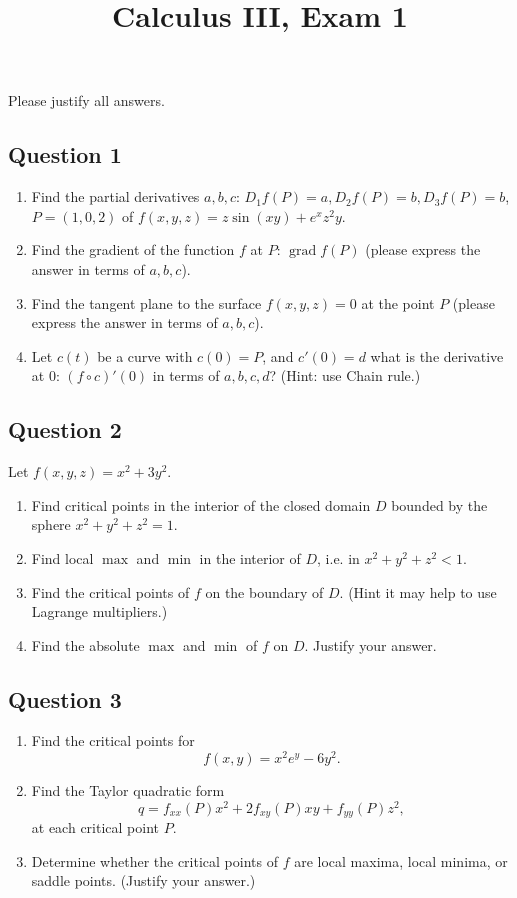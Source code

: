 \documentclass{amsart}
\numberwithin {equation} {section}
\DeclareMathOperator{\grad}{grad}
\begin{document}
 
\title {Calculus III, Exam 1}
\maketitle
Please justify all answers.
\subsection* {Question 1}
\begin{enumerate}
   \item Find the partial derivatives $a,b,c$: $D_1 f (P) =a, D_2f
      (P)=b, D_3f (P)=b$, $P= (1,0,2)$ of $f(x,y,z)= z\sin (xy)+e
      ^{x}z ^{2}y  $.
   \item Find the gradient of the function $f$ at $P$: $\grad f (P)$ (please express the answer in terms of
      $a,b,c$).
   \item Find the tangent plane to the surface $f(x,y,z)=0$ at the point $P$
      (please express the answer in terms of
      $a,b,c$).
   \item Let $c (t)$ be a curve with $c (0)=P$, and $c' (0)=d$ what is the
      derivative at $0$: $(f \circ
      c)' (0)$ in terms of $a,b,c,d$? (Hint: use Chain rule.)
\end{enumerate}
\newpage
\subsection* {Question 2}
Let $f (x,y,z) = x ^{2} + 3y ^{2}$.
\begin{enumerate}
   \item   
Find critical points in the interior of the closed domain $D$ bounded by the sphere $x
^{2} +y ^{2} +z ^{2}=1   $.
\item Find local $\max$ and $\min$ in the interior of $D$, i.e. in
   $x
^{2} +y ^{2} +z ^{2}<1  $.
\item Find the critical points of $f$ on the boundary of $D$.
    (Hint it may help to use
   Lagrange multipliers.)
\item  Find the absolute $\max$ and $\min$ of $f$ on $D$. Justify your answer.
\end{enumerate} 
\newpage

\subsection* {Question 3}
\begin{enumerate}
\item Find the critical points for $$f (x,y)=x ^{2} e ^{y}   - 6y ^{2}.  $$
   \item Find the Taylor quadratic form $$q=f _{xx} (P)x ^{2} + 2f _{xy} (P) xy + f _{yy} (P) z
^{2},  $$  at each critical point $P$.
\item Determine whether the critical points of $f$ are local maxima, local
   minima, or saddle points. (Justify your answer.)
\end{enumerate}
\newpage
\end{document}
